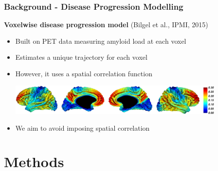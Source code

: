 \documentclass[8pt,xcolor=table]{beamer}
\begin{document}
\begin{frame}
\frametitle{Background - Disease Progression Modelling}

\newcommand{\mnpHeight}{3cm}

\vspace{-3em}
\textbf{Voxelwise disease progression model} (Bilgel et al., IPMI, 2015)
\begin{itemize}
  \item Built on PET data measuring amyloid load at each voxel
  \item Estimates a unique trajectory for each voxel
  \item However, it uses a spatial correlation function

  \vspace{2em}
  \includegraphics[width=0.85\textwidth]{bilgel_neuroimage}
  \vspace{2em}

  \item We aim to avoid imposing spatial correlation
  
  \end{itemize}



\end{frame}


\newcommand{\outFolder}{../../modelDiagram}
\newcommand{\lw}{0.5mm}

\section{Methods}
\end{document}
